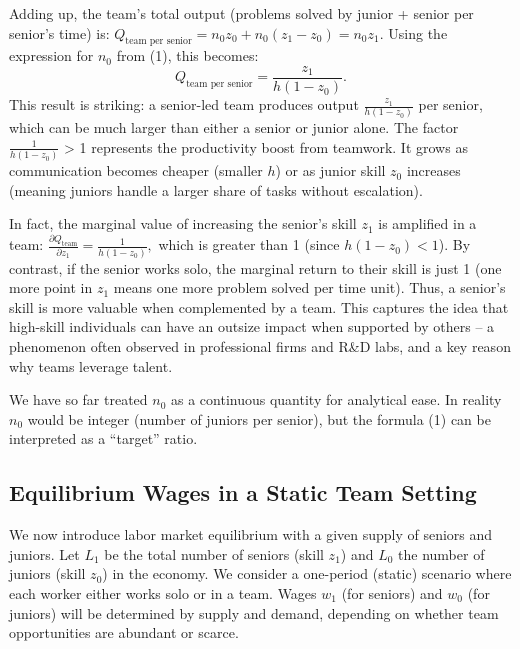 \documentclass[12pt]{article}
\begin{document}
Adding up, the {team's total output} (problems solved by junior +
senior per senior's time) is:
\(Q_{\text{team per senior}} = n_0 z_0 + n_0 (z_1 - z_0) = n_0 z_1.\)
Using the expression for \(n_0\) from (1), this becomes: 
\begin{equation}
Q_{\text{team per senior}}  =  \frac{z_1}{h(1 - z_0)}. \tag{2}
\end{equation}
This result is striking: a senior-led team produces output
\(\frac{z_1}{h(1-z_0)}\) per senior, which can be much larger than
either a senior or junior alone. The factor \(\frac{1}{h(1-z_0)}\)
>{} 1 represents the {productivity boost from
teamwork}. It grows as communication becomes cheaper (smaller \(h\)) or
as junior skill \(z_0\) increases (meaning juniors handle a larger share
of tasks without escalation).

In fact, the marginal value of increasing the senior's skill \(z_1\) is
amplified in a team:
\(\frac{\partial Q_{\text{team}}}{\partial z_1} = \frac{1}{h(1-z_0)},\)
which is greater than 1 (since \(h(1-z_0)<1\)). By contrast, if the
senior works {solo}, the marginal return to their skill is just 1
(one more point in \(z_1\) means one more problem solved per time unit).
{Thus, a senior's skill is more valuable when complemented by a
team}. This captures the idea that high-skill individuals can have an
outsize impact when supported by others -- a phenomenon often observed
in professional firms and R\&D labs, and a key reason why {teams
leverage talent}.

We have so far treated \(n_0\) as a continuous quantity for analytical
ease. In reality \(n_0\) would be integer (number of juniors per
senior), but the formula (1) can be interpreted as a ``target'' ratio.

\subsection{Equilibrium Wages in a Static Team
Setting}\label{equilibrium-wages-in-a-static-team-setting}

We now introduce {labor market equilibrium} with a given supply
of seniors and juniors. Let \(L_1\) be the total number of seniors
(skill \(z_1\)) and \(L_0\) the number of juniors (skill \(z_0\)) in the
economy. We consider a one-period (static) scenario where each worker
either works solo or in a team. Wages \(w_1\) (for seniors) and \(w_0\)
(for juniors) will be determined by supply and demand, depending on
whether team opportunities are abundant or scarce.
\end{document}
